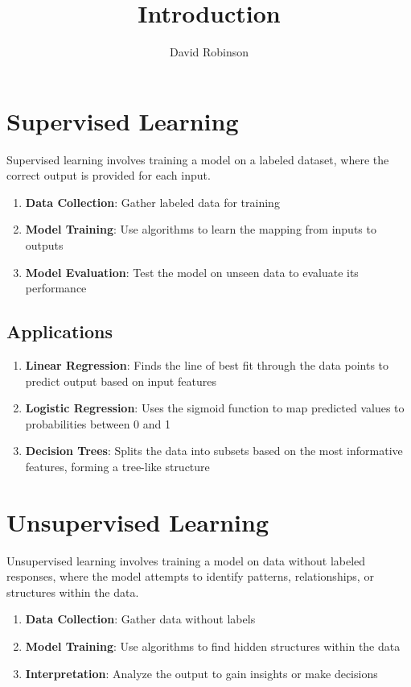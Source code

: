 \documentclass{article}
\title{Introduction}
\author{David Robinson}
\date{}
\begin{document}
\maketitle

\section*{Supervised Learning}

Supervised learning involves training a model on a labeled dataset, where the correct output is provided for each input.

\begin{enumerate}
    \item \textbf{Data Collection}: Gather labeled data for training
    \item \textbf{Model Training}: Use algorithms to learn the mapping from inputs to outputs
    \item \textbf{Model Evaluation}: Test the model on unseen data to evaluate its performance
\end{enumerate}

\subsection*{Applications}

\begin{enumerate}
    \item \textbf{Linear Regression}: Finds the line of best fit through the data points to predict output based on input features
    \item \textbf{Logistic Regression}: Uses the sigmoid function to map predicted values to probabilities between 0 and 1
    \item \textbf{Decision Trees}: Splits the data into subsets based on the most informative features, forming a tree-like structure
\end{enumerate}

\section*{Unsupervised Learning}

Unsupervised learning involves training a model on data without labeled responses, where the model attempts to identify patterns, relationships, or structures within the data.

\begin{enumerate}
    \item \textbf{Data Collection}: Gather data without labels
    \item \textbf{Model Training}: Use algorithms to find hidden structures within the data
    \item \textbf{Interpretation}: Analyze the output to gain insights or make decisions
\end{enumerate}
\end{document}
